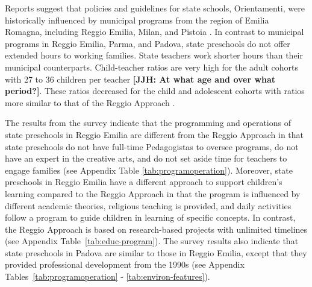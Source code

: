 %

Reports suggest that policies and guidelines for state schools, Orientamenti, were historically influenced by municipal programs from the region of Emilia Romagna, including Reggio Emilia, Milan, and Pistoia \citep{OECD_2001_Italy-Country-Note}. In contrast to municipal programs in Reggio Emilia, Parma, and Padova, state preschools do not offer extended hours to working families. State teachers work shorter hours than their municipal counterparts. Child-teacher ratios are very high for the adult cohorts with 27 to 36 children per teacher \textbf{[JJH: At what age and over what period?]}. These ratios decreased for the child and adolescent cohorts with ratios more similar to that of the Reggio Approach \citep{Hohnerlein_2015_Development-and-Diffusion}.


The results from the survey indicate that the programming and operations of state preschools in Reggio Emilia are different from the Reggio Approach in that state preschools do not have full-time Pedagogistas to oversee programs, do not have an expert in the creative arts, and do not set aside time for teachers to engage families (see Appendix Table \ref{tab:programoperation}). Moreover, state preschools in Reggio Emilia have a different approach to support children's learning compared to the Reggio Approach in that the program is  influenced by different academic theories, religious teaching is provided, and daily activities follow a program to guide children in learning of specific concepts. In contrast, the Reggio Approach is based on research-based projects with unlimited timelines (see Appendix Table~\ref{tab:educ-program}). The survey results also indicate that state preschools in Padova are similar to those in Reggio Emilia, except that they provided professional development from the 1990s (see Appendix Tables~\ref{tab:programoperation} - \ref{tab:environ-features}).

